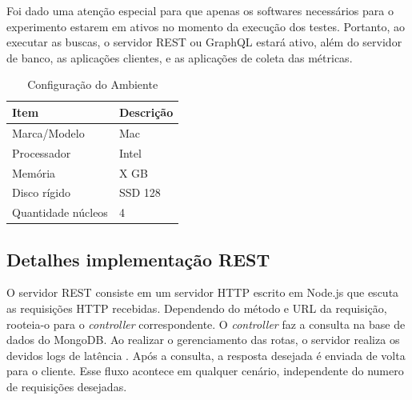 Foi dado uma atenção especial para que apenas os softwares necessários para o experimento estarem em ativos no momento da execução dos testes. Portanto, ao executar as buscas, o servidor REST ou GraphQL estará ativo, além do servidor de banco, as aplicações clientes, e as aplicações de coleta das métricas.

\begin{table}
    \centering
    \begin{tabular}{| l | l |}
        \hline
        \textbf{Item} & \textbf{Descrição} \\ \hline
        Marca/Modelo & Mac \\ \hline
        Processador & Intel \\ \hline
        Memória &  X GB  \\ \hline
        Disco rígido & SSD 128  \\ \hline
        Quantidade núcleos & 4  \\ \hline
    \end{tabular}
    \caption{Configuração do Ambiente} \label{tab:host}
\end{table}

\subsection{Detalhes implementação REST}

O servidor REST consiste em um servidor HTTP escrito em Node.js que escuta as requisições HTTP recebidas. Dependendo do método e URL da requisição, rooteia-o para o \textit{controller} correspondente. O \textit{controller} faz a consulta na base de dados do MongoDB. Ao realizar o gerenciamento das rotas, o servidor realiza os devidos logs de latência . Após a consulta, a resposta desejada é enviada de volta para o cliente. Esse fluxo acontece em qualquer cenário, independente do numero de requisições desejadas.


